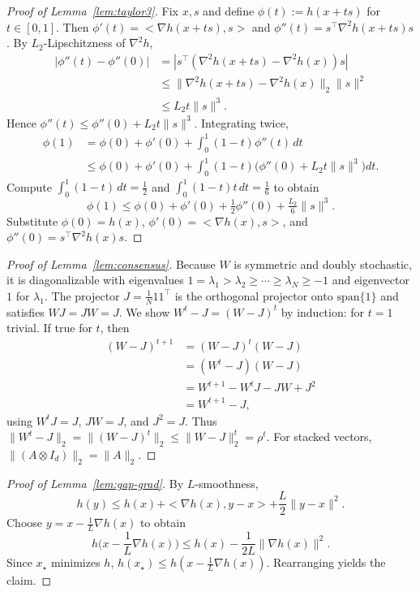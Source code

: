 \documentclass[10pt,twocolumn,letterpaper]{article}
\def\one{1}%
\def\J{J}%
\def\ip#1#2{<#1,#2>}%
\theoremstyle{compact}
\theoremstyle{compactremark}
\newcommand{\one}{\mathbf{1}}
\newcommand{\ip}[2]{\left\langle #1,#2\right\rangle}
\newcommand{\J}{\left(\frac{1}{N}\one\one^\top\right)}
\begin{document}
\begin{proof}[Proof of Lemma~\ref{lem:taylor3}]
Fix $x,s$ and define $\phi(t):=h(x+ts)$ for $t\in[0,1]$.
Then $\phi'(t)=\ip{\nabla h(x+ts)}{s}$ and $\phi''(t)=s^\top\nabla^2 h(x+ts)s$.
By $L_2$-Lipschitzness of $\nabla^2 h$,
\begin{align*}
|\phi''(t)\!-\!\phi''(0)|
&=|s^\top(\nabla^2 h(x\!+\!ts)\!-\!\nabla^2 h(x))s|\\
&\le \|\nabla^2 h(x\!+\!ts)\!-\!\nabla^2 h(x)\|_2\|s\|^2\\
&\le L_2 t\|s\|^3.
\end{align*}
Hence $\phi''(t)\le \phi''(0)+L_2 t\|s\|^3$.
Integrating twice,
\begin{align*}
\phi(1)&=\phi(0)+\phi'(0)+\int_0^1\!(1\!-\!t)\phi''(t)\,dt\\
&\le \phi(0)+\phi'(0)+\!\int_0^1\!(1\!-\!t)\big(\phi''(0)+L_2 t\|s\|^3\big)dt.
\end{align*}
Compute $\int_0^1(1-t)\,dt=\tfrac12$ and $\int_0^1(1-t)t\,dt=\tfrac16$ to obtain
\[
\phi(1)\le \phi(0)+\phi'(0)+\tfrac12\phi''(0)+\tfrac{L_2}{6}\|s\|^3.
\]
Substitute $\phi(0)=h(x)$, $\phi'(0)=\ip{\nabla h(x)}{s}$, and $\phi''(0)=s^\top\nabla^2 h(x)s$.
\end{proof}

\begin{proof}[Proof of Lemma~\ref{lem:consensus}]
Because $W$ is symmetric and doubly stochastic, it is diagonalizable with eigenvalues
$1=\lambda_1>\lambda_2\ge\cdots\ge\lambda_N\ge -1$ and eigenvector $\one$ for $\lambda_1$.
The projector $\J=\frac1N\one\one^\top$ is the orthogonal projector onto $\mathrm{span}\{\one\}$ and satisfies $W\J=\J W=\J$.
We show $W^t-\J=(W-\J)^t$ by induction: for $t=1$ trivial. If true for $t$, then
\begin{align*}
(W\!-\!\J)^{t+1}&=(W\!-\!\J)^t(W\!-\!\J)\\
&=(W^t\!-\!\J)(W\!-\!\J)\\
&=W^{t+1}\!-\!W^t\J\!-\!\J W\!+\!\J^2\\
&=W^{t+1}\!-\!\J,
\end{align*}
using $W^t\J=\J$, $\J W=\J$, and $\J^2=\J$.
Thus $\|W^t-\J\|_2=\|(W-\J)^t\|_2\le \|W-\J\|_2^t=\rho^t$.
For stacked vectors, $\|(A\otimes I_d)\|_2=\|A\|_2$.
\end{proof}

\begin{proof}[Proof of Lemma~\ref{lem:gap-grad}]
By $L$-smoothness,
\[
h(y)\le h(x)+\ip{\nabla h(x)}{y-x}+\frac{L}{2}\|y-x\|^2.
\]
Choose $y=x-\frac1L\nabla h(x)$ to obtain
\[
h\Big(x-\frac1L\nabla h(x)\Big)\le h(x)-\frac{1}{2L}\|\nabla h(x)\|^2.
\]
Since $x_\star$ minimizes $h$, $h(x_\star)\le h(x-\frac1L\nabla h(x))$. Rearranging yields the claim.
\end{proof}
\end{document}

